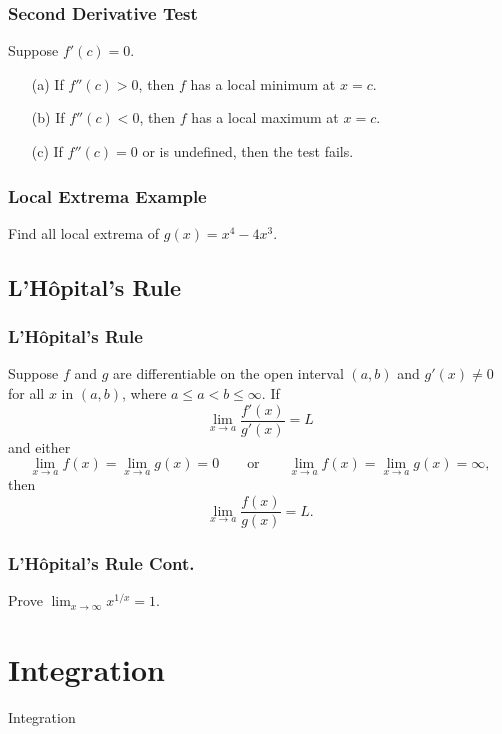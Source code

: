 \documentclass{beamer}
\begin{document}
\begin{frame}
\frametitle{Second Derivative Test}
Suppose $f'(c) = 0$.
\begin{enumerate}
\item[(a)] If $f''(c) > 0$, then $f$ has a local minimum at $x = c$.
\item[(b)] If $f''(c) < 0$, then $f$ has a local maximum at $x = c$.
\item[(c)] If $f''(c) = 0$ or is undefined, then the test fails.
\end{enumerate}
\end{frame}

\begin{frame}[t]
\frametitle{Local Extrema Example}
\begin{Example}
Find all local extrema of $g(x) = x^4 - 4x^3$.
\end{Example}
\end{frame}


\subsection{L'H\^{o}pital's Rule}

\begin{frame}
\frametitle{L'H\^{o}pital's Rule}

\begin{Theorem}
Suppose $f$ and $g$ are differentiable on the open interval $(a, b)$ and $g' (x) \neq 0$ for all $x$ in $(a, b)$, where $a\leq a < b \leq \infty$. If
$$
\lim_{x\to a} \frac{f'(x)}{g'(x)} = L
$$
and either
$$
\lim_{x\to a} f(x) = \lim_{x\to a} g(x) = 0\qquad\text{or}\qquad \lim_{x\to a} f(x) = \lim_{x\to a} g(x) = \infty,
$$
then
$$
\lim_{x\to a} \frac{f(x)}{g(x)} = L.
$$
\end{Theorem}
\end{frame}

\begin{frame}[t]
\frametitle{L'H\^{o}pital's Rule Cont.}
\begin{Example}
Prove $\displaystyle\lim_{x\to\infty} x^{1/x} = 1$.
\end{Example}
\end{frame}



\section{Integration}

\begin{frame}
\begin{center}
\Huge Integration
\end{center}
\end{frame}
\end{document}
